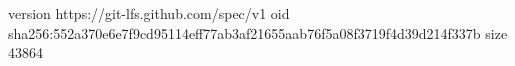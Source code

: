 version https://git-lfs.github.com/spec/v1
oid sha256:552a370e6e7f9cd95114eff77ab3af21655aab76f5a08f3719f4d39d214f337b
size 43864
